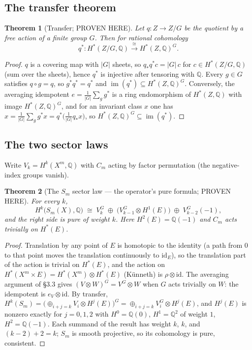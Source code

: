 \documentclass[11pt]{article}
\newtheorem{theorem}{Theorem}
\newcommand{\im}{\operatorname{im}}
\newcommand{\Q}{\mathbb Q}
\begin{document}
\subsection{The transfer theorem}

\begin{theorem}[Transfer; PROVEN HERE]
Let $q\colon Z\to Z/G$ be the quotient by a free action of a finite
group $G$. Then for rational cohomology
\[
q^*\colon H^*(Z/G,\Q)\xrightarrow{\ \cong\ }H^*(Z,\Q)^G .
\]
\end{theorem}

\begin{proof}
$q$ is a covering map with $|G|$ sheets, so $q_*q^*c=|G|\,c$ for
$c\in H^*(Z/G,\Q)$ (sum over the sheets), hence $q^*$ is injective after
tensoring with $\Q$. Every $g\in G$ satisfies $q\circ g=q$, so
$g^*q^*=q^*$ and $\im(q^*)\subseteq H^*(Z,\Q)^G$. Conversely, the
averaging idempotent $e=\frac1{|G|}\sum_{g}g^*$ is a ring endomorphism
of $H^*(Z,\Q)$ with image $H^*(Z,\Q)^G$, and for an invariant class
$x$ one has $x=\frac1{|G|}\sum_g g^*x=q^*\!\big(\frac1{|G|}q_*x\big)$,
so $H^*(Z,\Q)^G\subseteq\im(q^*)$.
\end{proof}

\subsection{The two sector laws}

Write $V_k=H^k(X^m,\Q)$ with $C_m$ acting by factor permutation
(the negative-index groups vanish).

\begin{theorem}[The $S_m$ sector law --- the operator's pure formula;
PROVEN HERE]
For every $k$,
\[
H^k\big(S_m(X),\Q\big)\;\cong\;
V_k^{G}\;\oplus\;\big(V_{k-1}^{G}\otimes H^1(E)\big)\;\oplus\;V_{k-2}^{G}(-1),
\]
and the right side is pure of weight $k$. Here $H^2(E)=\Q(-1)$ and
$C_m$ acts trivially on $H^*(E)$.
\end{theorem}

\begin{proof}
Translation by any point of $E$ is homotopic to the identity (a path
from $0$ to that point moves the translation continuously to
$\mathrm{id}_E$), so the translation part of the action is trivial on
$H^*(E)$, and the action on $H^*(X^m\times E)=H^*(X^m)\otimes H^*(E)$
(K\"unneth) is $\rho\otimes\mathrm{id}$. The averaging argument of
\S3.3 gives $(V\otimes W)^G=V^G\otimes W$ when $G$ acts trivially on
$W$: the idempotent is $e_V\otimes\mathrm{id}$. By transfer,
$H^k(S_m)=\big(\oplus_{i+j=k}V_i\otimes H^j(E)\big)^G
=\oplus_{i+j=k}V_i^G\otimes H^j(E)$, and $H^j(E)$ is nonzero exactly
for $j=0,1,2$ with $H^0=\Q(0)$, $H^1=\Q^2$ of weight $1$,
$H^2=\Q(-1)$. Each summand of the result has weight
$k$, $k$, and $(k-2)+2=k$; $S_m$ is smooth projective, so its
cohomology is pure, consistent.
\end{proof}
\end{document}
